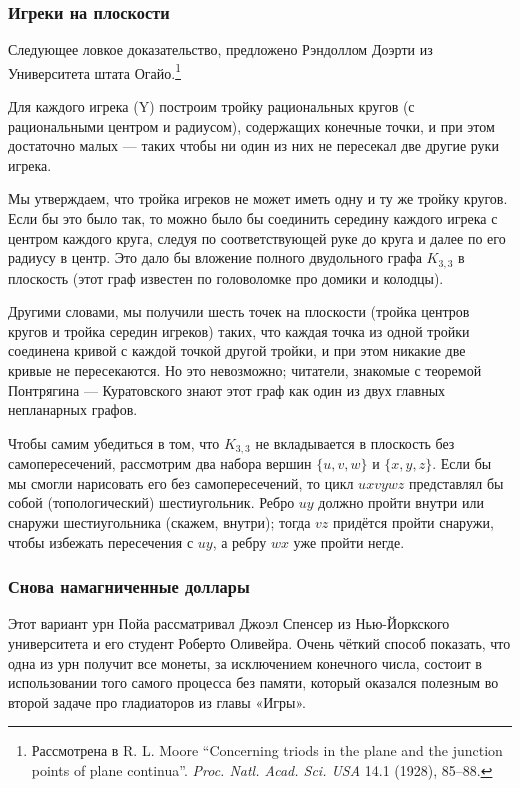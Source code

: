 \subsubsection*{Игреки на плоскости}

Следующее ловкое  доказательство, предложено Рэндоллом Доэрти из Университета штата Огайо.\footnote{Рассмотрена в R. L. Moore  ``Concerning triods in the plane and the junction points of plane continua''. \emph{Proc. Natl. Acad. Sci. USA} 14.1 (1928), 85--88.}

\medskip

Для каждого игрека (Y) построим тройку рациональных кругов (с рациональными центром и радиусом), содержащих конечные точки, и при этом достаточно малых --- таких чтобы ни один из них не пересекал две другие руки игрека.

Мы утверждаем, что тройка игреков не может иметь одну и ту же тройку кругов.
Если бы это было так, то можно было бы соединить середину каждого игрека с центром каждого круга, следуя по соответствующей руке до круга и далее по его радиусу в центр.
Это дало бы вложение полного двудольного графа $K_{3,3}$ в плоскость (этот граф известен по головоломке про домики и колодцы).

Другими словами, мы получили шесть точек на плоскости (тройка центров кругов и тройка середин игреков) таких, что каждая точка из одной тройки соединена кривой с каждой точкой другой тройки, и при этом никакие две кривые не пересекаются.
Но это невозможно; читатели, знакомые с теоремой Понтрягина --- Куратовского знают этот граф как один из двух главных непланарных графов.

Чтобы самим убедиться в том, что $K_{3,3}$ не вкладывается в плоскость без самопересечений, рассмотрим два набора вершин $\{u, v, w\}$ и $\{x, y, z\}$.
Если бы мы смогли нарисовать его без самопересечений, то цикл $uxvywz$ представлял бы  собой (топологический) шестиугольник.
Ребро $uy$ должно пройти внутри или снаружи шестиугольника (скажем, внутри);
тогда $vz$ придётся пройти снаружи, чтобы избежать пересечения с $uy$, а ребру $wx$ уже пройти негде.
\heart

\subsubsection*{Снова  намагниченные доллары}

Этот вариант урн Пойа рассматривал Джоэл Спенсер из Нью-Йоркского университета и его студент Роберто Оливейра.
Очень чёткий способ показать, что одна из урн получит все монеты, за исключением конечного числа, состоит в использовании того самого процесса без памяти, который оказался полезным во второй задаче про гладиаторов из главы «Игры».

